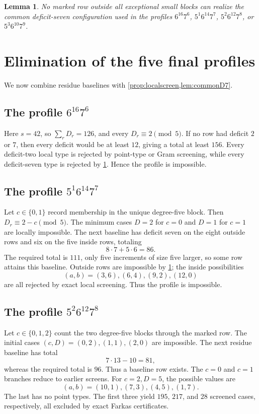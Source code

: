 \documentclass[11pt]{amsart}
\newtheorem{lemma}[theorem]{Lemma}
\begin{document}
\begin{lemma}\label{lem:commonD7}
No marked row outside all exceptional small blocks can realize the common deficit-seven configuration used in the profiles $6^{16}7^6$, $5^1 6^{14}7^7$, $5^2 6^{12}7^8$, or $5^3 6^{10}7^9$.
\end{lemma}

\section{Elimination of the five final profiles}
We now combine residue baselines with \cref{prop:localscreen,lem:commonD7}.

\subsection{The profile $6^{16}7^6$}
Here $s=42$, so $\sum_rD_r=126$, and every $D_r\equiv2\pmod5$. If no row had deficit $2$ or $7$, then every deficit would be at least $12$, giving a total at least $156$. Every deficit-two local type is rejected by point-type or Gram screening, while every deficit-seven type is rejected by \cref{lem:commonD7}. Hence the profile is impossible.

\subsection{The profile $5^1 6^{14}7^7$}
Let $c\in\{0,1\}$ record membership in the unique degree-five block. Then $D_r\equiv2-c\pmod5$. The minimum cases $D=2$ for $c=0$ and $D=1$ for $c=1$ are locally impossible. The next baseline has deficit seven on the eight outside rows and six on the five inside rows, totaling
\[
 8\cdot7+5\cdot6=86.
\]
The required total is $111$, only five increments of size five larger, so some row attains this baseline. Outside rows are impossible by \cref{lem:commonD7}; the inside possibilities
\[
 (a,b)=(3,6),(6,4),(9,2),(12,0)
\]
are all rejected by exact local screening. Thus the profile is impossible.

\subsection{The profile $5^2 6^{12}7^8$}
Let $c\in\{0,1,2\}$ count the two degree-five blocks through the marked row. The initial cases $(c,D)=(0,2),(1,1),(2,0)$ are impossible. The next residue baseline has total
\[
 7\cdot13-10=81,
\]
whereas the required total is $96$. Thus a baseline row exists. The $c=0$ and $c=1$ branches reduce to earlier screens. For $c=2,D=5$, the possible values are
\[
 (a,b)=(10,1),(7,3),(4,5),(1,7).
\]
The last has no point types. The first three yield $195$, $217$, and $28$ screened cases, respectively, all excluded by exact Farkas certificates.
\end{document}
